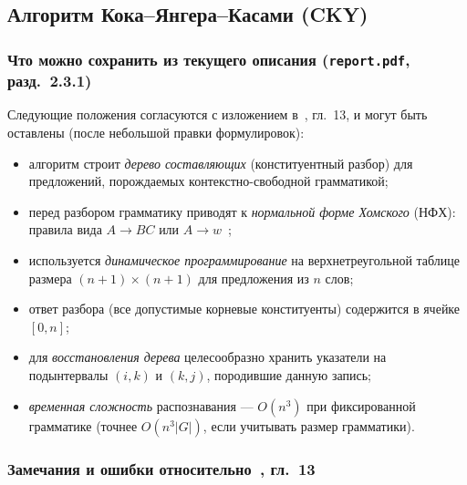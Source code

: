 
\subsection{Алгоритм Кока--Янгера--Касами (CKY)}

\subsubsection{Что можно сохранить из текущего описания (\texttt{report.pdf}, разд.~2.3.1)}

Следующие положения согласуются с изложением в~\cite{jurafsky2026speech}, гл.~13, и могут быть оставлены (после небольшой правки формулировок):
\begin{itemize}
	\item алгоритм строит \emph{дерево составляющих} (конституентный разбор) для предложений, порождаемых контекстно-свободной грамматикой;
	\item перед разбором грамматику приводят к \emph{нормальной форме Хомского} (НФХ): правила вида $A \to BC$ или $A \to w$~\cite{jurafsky2026speech};
	\item используется \emph{динамическое программирование} на верхнетреугольной таблице размера $(n{+}1)\times(n{+}1)$ для предложения из $n$ слов;
	\item ответ разбора (все допустимые корневые конституенты) содержится в ячейке $[0,n]$;
	\item для \emph{восстановления дерева} целесообразно хранить указатели на подынтервалы $(i,k)$ и $(k,j)$, породившие данную запись;
	\item \emph{временная сложность} распознавания --- $O(n^3)$ при фиксированной грамматике (точнее $O(n^3|G|)$, если учитывать размер грамматики).
\end{itemize}

\subsubsection{Замечания и ошибки относительно~\cite{jurafsky2026speech}, гл.~13}

